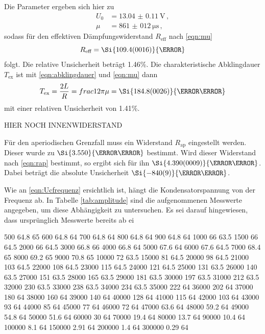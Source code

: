 Die Parameter ergeben sich hier zu
\begin{align*}
  U_0 &= \SI{13.04(011)}{\volt}\,, \\
  \mu &= \SI{861(012)}{\micro\second}\,,
\end{align*}
sodass für den effektiven Dämpfungswiderstand $R_\text{eff}$ nach \eqref{eqn:mu}
\begin{equation*}
  R_\text{eff} = \Si{109.4(0016)}{\ohm}
\end{equation*}
folgt. Die relative Unsicherheit beträgt 1.46\%. Die charakteristische
Abklingdauer $T_\text{ex}$ ist mit \eqref{eqn:abklingdauer} und \eqref{eqn:mu} dann
\begin{equation*}
  T_\text{ex} = \frac{2L}{R} = frac{1}{2\pi \mu} = \Si{184.8(0026)}{\micro\second}
\end{equation*}
mit einer relativen Unsicherheit von 1.41\%.

HIER NOCH INNENWIDERSTAND

Für den aperiodischen Grenzfall muss ein Widerstand $R_\text{ap}$ eingestellt werden.
Dieser wurde zu $\Si{3.550}{\kilo\ohm}$ bestimmt. Wird dieser Widerstand nach
\eqref{eqn:rap} bestimmt, so ergibt sich für ihn $\Si{4.390(0009)}{\kilo\ohm}$.
Dabei beträgt die absolute Unsicherheit $\Si{-840(9)}{\kilo\ohm}$.

Wie an \eqref{eqn:Ucfrequenz} ersichtlich ist, hängt die Kondensatorspannung von
der Frequenz ab. In Tabelle \ref{tab:amplitude} sind die aufgenommenen Messwerte
angegeben, um diese Abhängigkeit zu untersuchen. Es sei darauf hingewiesen, dass
ursprünglich Messwerte bereits ab ei

500	64.8		65
600	64.8		64
700	64.8		64
800	64.8		64
900	64.8		64
1000	66		63.5
1500	66		64.5
2000	66		64.5
3000	66.8		66
4000	66.8		64
5000	67.6		64
6000	67.6		64.5
7000	68.4		65
8000	69.2		65
9000	70.8		65
10000	72		63.5
15000	81		64.5
20000	98		64.5
21000	103		64.5
22000	108		64.5
23000	115		64.5
24000	121		64.5
25000	131		63.5
26000	140		63.5
27000	151		63.5
28000	165		63.5
29000	181		63.5
30000	197		63.5
31000	212		63.5
32000	230		63.5
33000	238		63.5
34000	234		63.5
35000	222		64
36000	202		64
37000	180		64
38000	160		64
39000	140		64
40000	128		64
41000	115		64
42000	103		64
43000	93		64
44000	85		64
45000	77		64
46000	72		64
47000	63.6		64
48000	59.2		64
49000	54.8		64
50000	51.6		64
60000	30		64
70000	19.4		64
80000	13.7		64
90000	10.4		64
100000	8.1		64
150000	2.91		64
200000	1.4		64
300000	0.29		64
